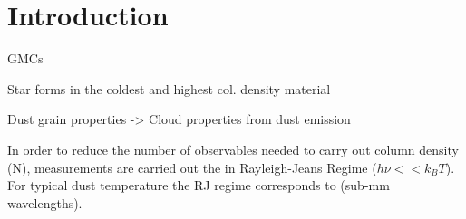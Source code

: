 \chapter{Introduction}

GMCs

Star forms in the coldest and highest col. density material

Dust grain properties -> Cloud properties from dust emission

In order to reduce the number of observables needed to carry out column density (N), measurements are carried out the in Rayleigh-Jeans Regime ($h\nu << k_B T$). For typical dust temperature the RJ regime corresponds to (sub-mm wavelengths).
